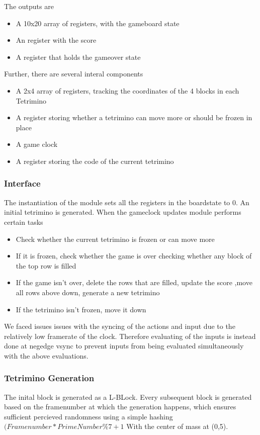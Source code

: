 The outputs are 
\begin{itemize}
    \item A 10x20 array of registers, with the gameboard state
    \item An register with the score
    \item A register that holds the gameover state 
\end{itemize}

Further, there are several interal components 
\begin{itemize}
    \item A 2x4 array of registers, tracking the coordinates of the 4 blocks in each Tetrimino
    \item A register storing whether a tetrimino can move more or should be frozen in place
    \item A game clock 
    \item A register storing the code of the current tetrimino
\end{itemize}

\subsubsection{Interface}
\label{subsubsection:interface}
The instantiation of the module sets all the registers in the boardstate to 0. An initial tetrimino is generated.
\newline 
When the gameclock updates module performs certain tasks 
\begin{itemize}
    \item Check whether the current tetrimino is frozen or can move more
    \item If it is frozen, check whether the game is over checking whether any block of the top row is filled
    \item If the game isn't over, delete the rows that are filled, update the score ,move all rows above down, generate a new tetrimino
    \item If the tetrimino isn't frozen, move it down 
\end{itemize}
We faced issues issues with the syncing of the actions and input due to the relatively low framerate of the clock. 
Therefore evaluating of the inputs is instead done at negedge vsync to prevent inputs 
from being evaluated simultaneously with the above evaluations.
\subsubsection{Tetrimino Generation }
\label{subsubsection:tetgen}
The inital block is generated as a L-BLock. 
Every subsequent block is generated based on the framenumber 
at which the generation happens, which ensures sufficient percieved 
randomness using a simple hashing
 \( (Framenumber*PrimeNumber \% 7 +1 \) 
With the center of mass at (0,5).
